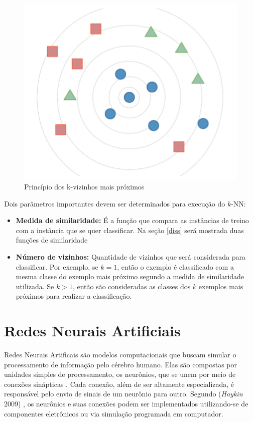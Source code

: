 \begin{figure}[H]
	\centering
	\includegraphics[scale=0.5]{pasta1_figuras/knn.png}
	\caption{Princípio dos k-vizinhos mais próximos}
	\label{fig-knn}
\end{figure}

Dois parâmetros importantes devem ser determinados para execução do $k$-NN:
\begin{itemize}
	\item \textbf{Medida de similaridade: } É a função que compara as instâncias de treino com a instância que se quer classificar. Na seção \ref{diss} será mostrada duas funções de similaridade
	\item \textbf{Número de vizinhos: } Quantidade de vizinhos que será considerada para classificar. Por exemplo, se $k=1$, então o exemplo é classificado com a mesma classe do exemplo mais próximo segundo a medida de similaridade utilizada. Se $k>1$, então são consideradas as classes dos $k$ exemplos mais próximos para realizar a classificação.
\end{itemize}


\section{Redes Neurais Artificiais}
Redes Neurais Artificais são modelos computacionais que buscam simular o processamento de informação pelo cérebro humano. Elas são compostas por unidades simples de processamento, os neurônios, que se unem por meio de conexões sinápticas \cite{zhang1998}. Cada conexão, além de ser altamente especializada, é responsável pelo envio de sinais de um neurônio para outro. Segundo (\textit{Haykin} 2009\cite{haykin2009}) , os neurônios e suas conexões podem ser implementados utilizando-se de componentes eletrônicos ou via simulação programada em computador.


